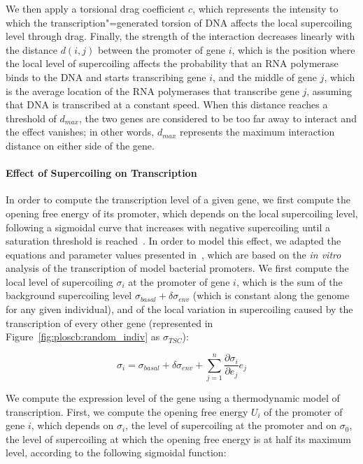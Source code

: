 We then apply a torsional drag coefficient $c$, which represents the intensity to which the transcription"=generated torsion of DNA affects the local supercoiling level through drag.
Finally, the strength of the interaction decreases linearly with the distance $d(i, j)$ between the promoter of gene $i$, which is the position where the local level of supercoiling affects the probability that an RNA polymerase binds to the DNA and starts transcribing gene $i$, and the middle of gene $j$, which is the average location of the RNA polymerases that transcribe gene $j$, assuming that DNA is transcribed at a constant speed.
When this distance reaches a threshold of $d_{max}$, the two genes are considered to be too far away to interact and the effect vanishes; in other words, $d_{max}$ represents the maximum interaction distance on either side of the gene.

\paragraph{Effect of Supercoiling on Transcription}
In order to compute the transcription level of a given gene, we first compute the opening free energy of its promoter, which depends on the local supercoiling level, following a sigmoidal curve that increases with negative supercoiling until a saturation threshold is reached~\citep{forquet2021}.
In order to model this effect, we adapted the equations and parameter values presented in~\cite{elhoudaigui2019}, which are based on the \emph{in vitro} analysis of the transcription of model bacterial promoters.
We first compute the local level of supercoiling $\sigma_i$ at the promoter of gene $i$, which is the sum of the background supercoiling level $\sigma_{basal} + \delta\sigma_{env}$ (which is constant along the genome for any given individual), and of the local variation in supercoiling caused by the transcription of every other gene (represented in Figure~\ref{fig:ploscb:random_indiv} as $\sigma_{TSC}$):

\begin{equation}
\sigma_i = \sigma_{basal} + \delta\sigma_{env} + \sum_{j=1}^n\frac{\partial\sigma_{i}}{\partial e_j}e_j
\label{eq:sigma}
\end{equation}

We compute the expression level of the gene using a thermodynamic model of transcription.
First, we compute the opening free energy $U_i$ of the promoter of gene $i$, which depends on $\sigma_i$, the level of supercoiling at the promoter and on $\sigma_0$, the level of supercoiling at which the opening free energy is at half its maximum level, according to the following sigmoidal function:

